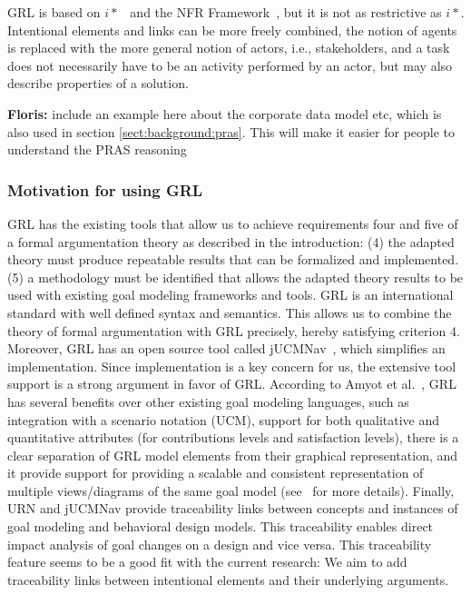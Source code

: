 \documentclass[11.5pt,two column]{llncs}
\newcommand{\floris}[1]{{\color{red}\textbf{Floris: }#1}}
\begin{document}
GRL is based on $i*$~\cite{Yu:1997:TMR:827255.827807} and the NFR Framework~\cite{chung2012non}, but it is not as restrictive as $i*$. Intentional elements and links can be more freely combined, the notion of agents is replaced with the more general notion of actors, i.e., stakeholders, and a task does not necessarily have to be an activity performed by an actor, but may also describe properties of a solution. %

\floris{include an example here about the corporate data model etc, which is also used in section \ref{sect:background:pras}. This will make it easier for people to understand the PRAS reasoning}

\subsubsection{Motivation for using GRL}
\label{sect:background:grl:motivation} %

GRL has the existing tools %
that allow us to achieve requirements four and five of a formal argumentation theory as described in the introduction: (4) the adapted theory must produce repeatable results that can be formalized and implemented. (5) a methodology must be identified that allows the adapted theory results to be used with existing goal modeling frameworks and tools. GRL is an international standard with well defined syntax and semantics. This allows us to combine the theory of formal argumentation with GRL precisely, hereby satisfying criterion 4. Moreover, GRL has an open source tool called jUCMNav~\cite{jUCMNav}, which simplifies an implementation. Since implementation is a key concern for us, the extensive tool support is a strong argument in favor of GRL. According to Amyot et al.~\cite{amyot2009lightweight}, GRL has several benefits over other existing goal modeling languages, such as integration with a scenario notation (UCM), support for both qualitative and quantitative attributes (for contributions levels and satisfaction levels), there is a clear separation of GRL model elements from their graphical representation, and it provide support for providing a scalable and consistent representation of multiple views/diagrams of the same goal model (see~\cite[Ch.2]{Ghanavati2013} for more details). Finally, URN and jUCMNav provide traceability links between concepts and instances of goal modeling and behavioral design models. This traceability enables direct impact analysis of goal changes on a design and vice versa. This traceability feature seems to be a good fit with the current research: We aim to add traceability links between intentional elements and their underlying arguments. %
\end{document}
